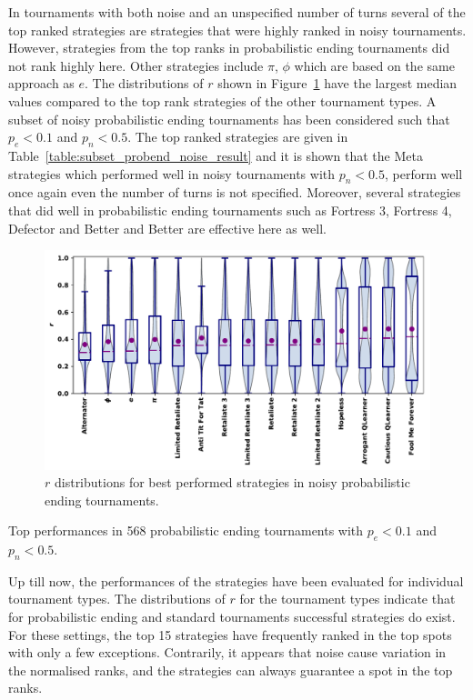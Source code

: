 \documentclass{article}
\newcommand{\numberofstrategies}{}
\begin{document}
In tournaments with both noise and an unspecified number of turns several of the
top ranked strategies are strategies that were highly ranked in noisy
tournaments. However, strategies from the top ranks in probabilistic ending
tournaments did not rank highly here. Other strategies include $\pi$, $\phi$
which are based on the same approach as $e$. The distributions of \(r\) shown in
Figure~\ref{fig:noisy_probend_results} have the largest median values compared
to the top rank strategies of the other tournament types. A subset of noisy
probabilistic ending tournaments has been considered such that \(p_e < 0.1\) and
\(p_n < 0.5\). The top ranked strategies are given in
Table~\ref{table:subset_probend_noise_result} and it is shown that the Meta
strategies which performed well in noisy tournaments with \(p_n < 0.5\), perform
well once again even the number of turns is not specified. Moreover, several
strategies that did well in probabilistic ending tournaments such as Fortress 3,
Fortress 4, Defector and Better and Better are effective here as well.

\begin{figure}[!htbp]
    \centering
    \includegraphics[width=.7\textwidth]{../images/performance_probend_noise.pdf}
    \caption{\(r\) distributions for best performed strategies in noisy
    probabilistic ending tournaments.}
    \label{fig:noisy_probend_results}
\end{figure}

\begin{table}[!htbp]
    \centering
    \resizebox{.30\textwidth}{!}{
    }
    \caption{Top performances in 568 probabilistic ending tournaments with \(p_e < 0.1\) and \(p_n < 0.5\).}
    \label{table:subset_probend_noise_result}
\end{table}

Up till now, the performances of the \numberofstrategies strategies have been evaluated for
individual tournament types. The distributions of \(r\) for the tournament types indicate that
for probabilistic ending and standard tournaments successful strategies do exist.
For these settings, the top 15 strategies have frequently ranked in
the top spots with only a few exceptions. Contrarily, it appears that noise
cause variation in the normalised ranks, and the strategies can always guarantee
a spot in the top ranks.
\end{document}
